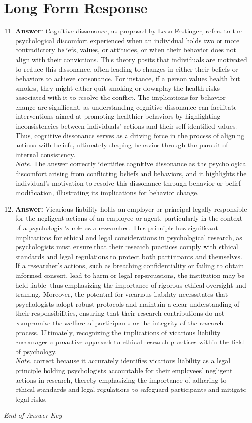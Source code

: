 \documentclass[12pt]{article}
\begin{document}
\section*{Long Form Response}
\begin{enumerate}[label=\arabic*.]
\setcounter{enumi}{10}
\item \textbf{Answer:} Cognitive dissonance, as proposed by Leon Festinger, refers to the psychological discomfort experienced when an individual holds two or more contradictory beliefs, values, or attitudes, or when their behavior does not align with their convictions. This theory posits that individuals are motivated to reduce this dissonance, often leading to changes in either their beliefs or behaviors to achieve consonance. For instance, if a person values health but smokes, they might either quit smoking or downplay the health risks associated with it to resolve the conflict. The implications for behavior change are significant, as understanding cognitive dissonance can facilitate interventions aimed at promoting healthier behaviors by highlighting inconsistencies between individuals' actions and their self-identified values. Thus, cognitive dissonance serves as a driving force in the process of aligning actions with beliefs, ultimately shaping behavior through the pursuit of internal consistency.
\\ \textit{Note:} The answer correctly identifies cognitive dissonance as the psychological discomfort arising from conflicting beliefs and behaviors, and it highlights the individual's motivation to resolve this dissonance through behavior or belief modification, illustrating its implications for behavior change.
\item \textbf{Answer:} Vicarious liability holds an employer or principal legally responsible for the negligent actions of an employee or agent, particularly in the context of a psychologist's role as a researcher. This principle has significant implications for ethical and legal considerations in psychological research, as psychologists must ensure that their research practices comply with ethical standards and legal regulations to protect both participants and themselves. If a researcher's actions, such as breaching confidentiality or failing to obtain informed consent, lead to harm or legal repercussions, the institution may be held liable, thus emphasizing the importance of rigorous ethical oversight and training. Moreover, the potential for vicarious liability necessitates that psychologists adopt robust protocols and maintain a clear understanding of their responsibilities, ensuring that their research contributions do not compromise the welfare of participants or the integrity of the research process. Ultimately, recognizing the implications of vicarious liability encourages a proactive approach to ethical research practices within the field of psychology.
\\ \textit{Note:} correct because it accurately identifies vicarious liability as a legal principle holding psychologists accountable for their employees' negligent actions in research, thereby emphasizing the importance of adhering to ethical standards and legal regulations to safeguard participants and mitigate legal risks.
\end{enumerate}

\vfill
\noindent\textit{End of Answer Key}
\end{document}
